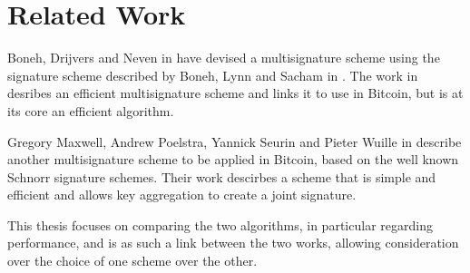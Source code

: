 \chapter{Related Work}
Boneh, Drijvers and Neven in \cite{BLSMulti} have devised a multisignature scheme using the signature scheme described by Boneh, Lynn and Sacham in \cite{BLS}. The work in \cite{BLSMulti} desribes an efficient multisignature scheme and links it to use in Bitcoin, but is at its core an efficient algorithm.

Gregory Maxwell, Andrew Poelstra, Yannick Seurin and Pieter Wuille in \cite{SchnorrMulti} describe another multisignature scheme to be applied in Bitcoin, based on the well known Schnorr signature schemes. Their work descirbes a scheme that is simple and efficient and allows key aggregation to create a joint signature.

This thesis focuses on comparing the two algorithms, in particular regarding performance, and is as such a link between the two works, allowing consideration over the choice of one scheme over the other.